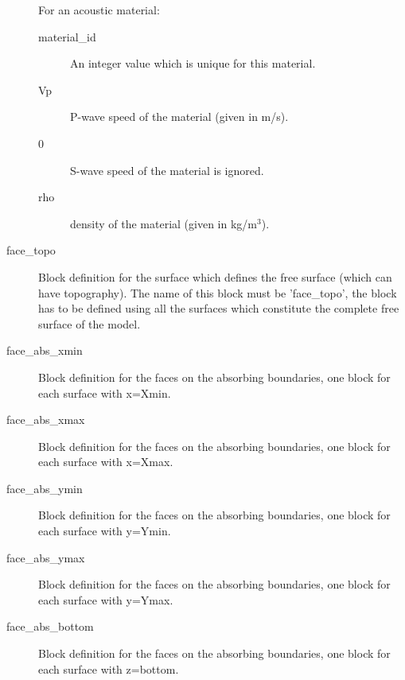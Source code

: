 \begin{description}
For an acoustic material:
\begin{description}
\item [{material\_id}] An integer value which is unique for this material.
\item [{Vp}] P-wave speed of the material (given in m/s).
\item [{0}] S-wave speed of the material is ignored.
\item [{rho}] density of the material (given in kg/m$^{3}$).
\end{description}
\item [{face\_topo}] Block definition for the surface which defines the
free surface (which can have topography). The name of this block must
be 'face\_topo', the block has to be defined using all the surfaces
which constitute the complete free surface of the model.
\item [{face\_abs\_xmin}] Block definition for the faces on the absorbing
boundaries, one block for each surface with x=Xmin.
\item [{face\_abs\_xmax}] Block definition for the faces on the absorbing
boundaries, one block for each surface with x=Xmax.
\item [{face\_abs\_ymin}] Block definition for the faces on the absorbing
boundaries, one block for each surface with y=Ymin.
\item [{face\_abs\_ymax}] Block definition for the faces on the absorbing
boundaries, one block for each surface with y=Ymax.
\item [{face\_abs\_bottom}] Block definition for the faces on the absorbing
boundaries, one block for each surface with z=bottom.
\end{description}
%
